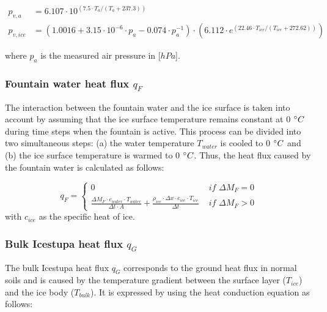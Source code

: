 \documentclass[utf8]{frontiersSCNS} %
\begin{document}
\begin{equation} \begin{split} p_{v,a}&=6.107 \cdot 10^{(7.5 \cdot T_a / (T_a + 237.3))}\\ p_{v,ice}&=(1.0016 +
3.15\cdot10^{-6}\cdot p_{a}-0.074\cdot p_{a}^{-1})\cdot(6.112 \cdot e^{(22.46 \cdot T_{ice} / (T_{ice} + 272.62))})
\end{split} \label{eqn:vp} \end{equation}

where $p_{a}$ is the measured air pressure in [$hPa$].  

\subsubsection{Fountain water heat flux \texorpdfstring{$q_{F}$}{Lg} }

The interaction between the fountain water and the ice surface is taken into account by assuming that the ice surface
temperature remains constant at 0 $\degree C$ during time steps when the fountain is active. This process can be divided
into two simultaneous steps: (a) the water temperature $T_{water}$ is cooled to 0 $\degree C$ and (b) the ice surface
temperature is warmed to 0 $\degree C$. Thus, the heat flux caused by the fountain water is calculated as follows:

\begin{equation} 
  q_{F} = \left\{ \begin{array}{ll}
         0 & \textit{ if } \Delta M_{F} = 0\\ \frac{ \Delta M_F \cdot c_{water} \cdot T_{water}}{\Delta t \cdot A} +
         \frac{\rho_{ice} \cdot \Delta x \cdot c_{ice} \cdot T_{ice}}{\Delta t} & \textit{ if } \Delta M_{F} > 0 
    \end{array} \right.  \label{eqn:qF}
\end{equation} 
with $c_{ice}$ as the specific heat of ice. 

\subsubsection{Bulk Icestupa heat flux \texorpdfstring{$q_{G}$}{Lg}} \label{sec:Bulkflux}
The bulk Icestupa heat flux $q_{G}$ corresponds to the ground heat flux in normal soils and is caused by the temperature
gradient between the surface layer ($T_{ice}$) and the ice body ($T_{bulk}$). It is expressed by using the heat
conduction equation as follows:
\end{document}
